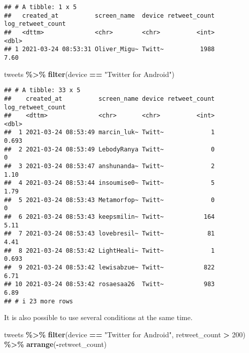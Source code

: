 \documentclass[
]{article}
\newenvironment{Shaded}{\begin{snugshade}}{\end{snugshade}}
\newcommand{\DecValTok}[1]{\textcolor[rgb]{0.00,0.00,0.81}{#1}}
\newcommand{\FunctionTok}[1]{\textcolor[rgb]{0.13,0.29,0.53}{\textbf{#1}}}
\newcommand{\NormalTok}[1]{#1}
\newcommand{\SpecialCharTok}[1]{\textcolor[rgb]{0.81,0.36,0.00}{\textbf{#1}}}
\newcommand{\StringTok}[1]{\textcolor[rgb]{0.31,0.60,0.02}{#1}}
\begin{document}
\begin{verbatim}
## # A tibble: 1 x 5
##   created_at          screen_name  device retweet_count log_retweet_count
##   <dttm>              <chr>        <chr>          <int>             <dbl>
## 1 2021-03-24 08:53:31 Oliver_Migu~ Twitt~          1988              7.60
\end{verbatim}

\begin{Shaded}
\begin{Highlighting}[]
\NormalTok{tweets }\SpecialCharTok{\%\textgreater{}\%}
  \FunctionTok{filter}\NormalTok{(device }\SpecialCharTok{==} \StringTok{"Twitter for Android"}\NormalTok{)}
\end{Highlighting}
\end{Shaded}

\begin{verbatim}
## # A tibble: 33 x 5
##    created_at          screen_name device retweet_count log_retweet_count
##    <dttm>              <chr>       <chr>          <int>             <dbl>
##  1 2021-03-24 08:53:49 marcin_luk~ Twitt~             1             0.693
##  2 2021-03-24 08:53:49 LebodyRanya Twitt~             0             0    
##  3 2021-03-24 08:53:47 anshunanda~ Twitt~             2             1.10 
##  4 2021-03-24 08:53:44 insoumise0~ Twitt~             5             1.79 
##  5 2021-03-24 08:53:43 Metamorfop~ Twitt~             0             0    
##  6 2021-03-24 08:53:43 keepsmilin~ Twitt~           164             5.11 
##  7 2021-03-24 08:53:43 lovebresil~ Twitt~            81             4.41 
##  8 2021-03-24 08:53:42 LightHeali~ Twitt~             1             0.693
##  9 2021-03-24 08:53:42 lewisabzue~ Twitt~           822             6.71 
## 10 2021-03-24 08:53:42 rosaesaa26  Twitt~           983             6.89 
## # i 23 more rows
\end{verbatim}

It is also possible to use several conditions at the same time.

\begin{Shaded}
\begin{Highlighting}[]
\NormalTok{tweets }\SpecialCharTok{\%\textgreater{}\%}
  \FunctionTok{filter}\NormalTok{(device }\SpecialCharTok{==} \StringTok{"Twitter for Android"}\NormalTok{,}
\NormalTok{         retweet\_count }\SpecialCharTok{\textgreater{}} \DecValTok{200}\NormalTok{) }\SpecialCharTok{\%\textgreater{}\%}
  \FunctionTok{arrange}\NormalTok{(}\SpecialCharTok{{-}}\NormalTok{retweet\_count)}
\end{Highlighting}
\end{Shaded}
\end{document}

